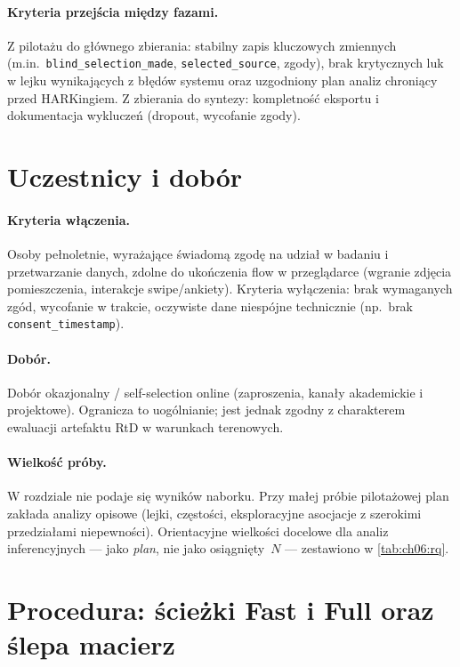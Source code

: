 \paragraph{Kryteria przejścia między fazami.}
Z pilotażu do głównego zbierania: stabilny zapis kluczowych zmiennych (m.in.\ \texttt{blind\_selection\_made}, \texttt{selected\_source}, zgody), brak krytycznych luk w lejku wynikających z błędów systemu oraz uzgodniony plan analiz chroniący przed HARKingiem. Z zbierania do syntezy: kompletność eksportu i dokumentacja wykluczeń (dropout, wycofanie zgody).

\section{Uczestnicy i dobór}
\label{ch06:sec:uczestnicy}

\paragraph{Kryteria włączenia.}
Osoby pełnoletnie, wyrażające świadomą zgodę na udział w badaniu i przetwarzanie danych, zdolne do ukończenia flow w przeglądarce (wgranie zdjęcia pomieszczenia, interakcje swipe/ankiety). Kryteria wyłączenia: brak wymaganych zgód, wycofanie w trakcie, oczywiste dane niespójne technicznie (np.\ brak \texttt{consent\_timestamp}).

\paragraph{Dobór.}
Dobór okazjonalny / self-selection online (zaproszenia, kanały akademickie i projektowe). Ogranicza to uogólnianie; jest jednak zgodny z charakterem ewaluacji artefaktu RtD w warunkach terenowych.

\paragraph{Wielkość próby.}
W rozdziale nie podaje się wyników naborku. Przy małej próbie pilotażowej plan zakłada analizy opisowe (lejki, częstości, eksploracyjne asocjacje z szerokimi przedziałami niepewności). Orientacyjne wielkości docelowe dla analiz inferencyjnych --- jako \emph{plan}, nie jako osiągnięty~$N$ --- zestawiono w \cref{tab:ch06:rq}.

\section{Procedura: ścieżki Fast i Full oraz ślepa macierz}
\label{ch06:sec:procedura}

